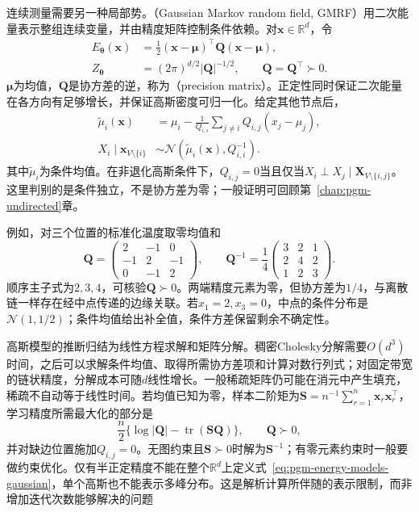 连续测量需要另一种局部势。（Gaussian Markov random field, GMRF）用二次能量表示整组连续变量，并由精度矩阵控制条件依赖。对$\bm{x}\in\mathbb{R}^d$，令
\begin{equation}
  \begin{aligned}
    E_{\bm{\theta}}(\bm{x})
      &=\frac12(\bm{x}-\bm{\mu})^\top
                    \bm{Q}(\bm{x}-\bm{\mu}),\\
    Z_{\bm{\theta}}
      &=(2\pi)^{d/2}|\bm{Q}|^{-1/2},
      \qquad \bm{Q}=\bm{Q}^\top\succ0.
  \end{aligned}
  \label{eq:pgm-energy-models-gaussian}
\end{equation}
$\bm{\mu}$为均值，$\bm{Q}$是协方差的逆，称为（precision matrix）。正定性同时保证二次能量在各方向有足够增长，并保证高斯密度可归一化。给定其他节点后，
\[
  \begin{aligned}
    \widetilde{\mu}_i(\bm{x})
      &=\mu_i-\frac{1}{Q_{i,i}}
           \sum_{j\ne i}Q_{i,j}(x_j-\mu_j),\\
    X_i\mid\bm{x}_{V\setminus\{i\}}
      &\sim\mathcal{N}\!\left(
          \widetilde{\mu}_i(\bm{x}),Q_{i,i}^{-1}\right).
  \end{aligned}
\]
其中$\widetilde{\mu}_i$为条件均值。在非退化高斯条件下，$Q_{i,j}=0$当且仅当$X_i\perp X_j\mid\bm{X}_{V\setminus\{i,j\}}$。这里判别的是条件独立，不是协方差为零；一般证明可回顾第~\ref{chap:pgm-undirected}章。

例如，对三个位置的标准化温度取零均值和
\[
  \bm{Q}=
  \begin{pmatrix}
    2&-1&0\\ -1&2&-1\\ 0&-1&2
  \end{pmatrix},
  \qquad
  \bm{Q}^{-1}=\frac14
  \begin{pmatrix}
    3&2&1\\ 2&4&2\\ 1&2&3
  \end{pmatrix}.
\]
顺序主子式为$2,3,4$，可核验$\bm{Q}\succ0$。两端精度元素为零，但协方差为$1/4$，与离散链一样存在经中点传递的边缘关联。若$x_1=2,x_3=0$，中点的条件分布是$\mathcal{N}(1,1/2)$；条件均值给出补全值，条件方差保留剩余不确定性。

高斯模型的推断归结为线性方程求解和矩阵分解。稠密Cholesky分解需要$O(d^3)$时间，之后可以求解条件均值、取得所需协方差项和计算对数行列式；对固定带宽的链状精度，分解成本可随$d$线性增长。一般稀疏矩阵仍可能在消元中产生填充，稀疏不自动等于线性时间。若均值已知为零，样本二阶矩为$\bm{S}=n^{-1}\sum_{r=1}^n\bm{x}_r\bm{x}_r^\top$，学习精度所需最大化的部分是
\[
  \frac n2\{\log|\bm{Q}|-\operatorname{tr}(\bm{S}\bm{Q})\},
  \qquad \bm{Q}\succ0,
\]
并对缺边位置施加$Q_{i,j}=0$。无图约束且$\bm{S}\succ0$时解为$\bm{S}^{-1}$；有零元素约束时一般要做约束优化。仅有半正定精度不能在整个$\mathbb{R}^d$上定义式~\eqref{eq:pgm-energy-models-gaussian}，单个高斯也不能表示多峰分布。这是解析计算所伴随的表示限制，而非增加迭代次数能够解决的问题

